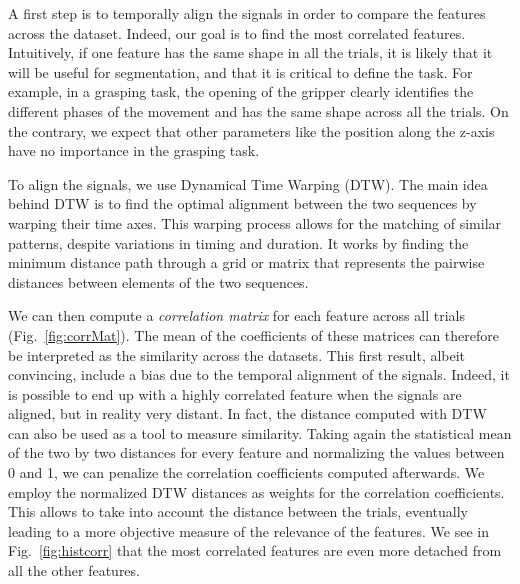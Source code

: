 \documentclass[conference]{IEEEtran}
\begin{document}
A first step is to temporally align the signals in order to compare the features across the dataset. Indeed, our goal is to find the most correlated features. Intuitively, if one feature has the same shape in all the trials, it is likely that it will be useful for segmentation, and that it is critical to define the task. For example, in a grasping task, the opening of the gripper clearly identifies the different phases of the movement and has the same shape across all the trials. On the contrary, we expect that other parameters like the position along the z-axis have no importance in the grasping task.

To align the signals, we use Dynamical Time Warping (DTW). The main idea behind DTW is to find the optimal alignment between the two sequences by warping their time axes. This warping process allows for the matching of similar patterns, despite variations in timing and duration. It works by finding the minimum distance path through a grid or matrix that represents the pairwise distances between elements of the two sequences. \newline


We can then compute a \textit{correlation matrix} for each feature across all trials (Fig.~\ref{fig:corrMat}). The mean of the coefficients of these matrices can therefore be interpreted as the similarity across the datasets. This first result, albeit convincing, include a bias due to the temporal alignment of the signals. Indeed, it is possible to end up with a highly correlated feature when the signals are aligned, but in reality very distant. In fact, the distance computed with DTW can also be used as a tool to measure similarity. Taking again the statistical mean of the two by two distances for every feature and normalizing the values between 0 and 1, we can penalize the correlation coefficients computed afterwards. We employ the normalized DTW distances as weights for the correlation coefficients. This allows to take into account the distance between the trials, eventually leading to a more objective measure of the relevance of the features. We see in Fig.~\ref{fig:histcorr} that the most correlated features are even more detached from all the other features.  
\end{document}

